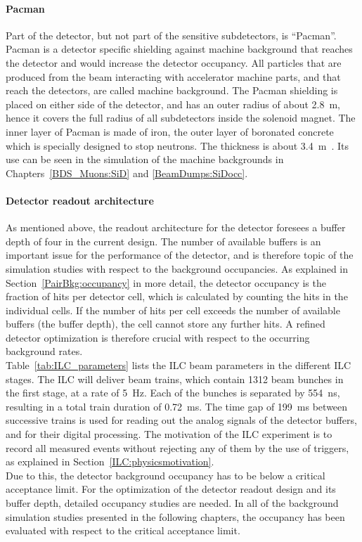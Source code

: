 \paragraph{Pacman}
Part of the detector, but not part of the sensitive subdetectors, is ``Pacman''.
Pacman is a detector specific shielding against machine background that reaches the detector and would increase the detector occupancy.
All particles that are produced from the beam interacting with accelerator machine parts, and that reach the detectors, are called machine background.
The Pacman shielding is placed on either side of the detector, and has an outer radius of about \SI{2.8}{\meter}, hence it covers the full radius of all subdetectors inside the solenoid magnet.
The inner layer of Pacman is made of iron, the outer layer of boronated concrete which is specially designed to stop neutrons.
The thickness is about \SI{3.4}{\meter}~\cite{SiD_Geo}.
Its use can be seen in the simulation of the machine backgrounds in Chapters~\ref{BDS_Muons:SiD} and \ref{BeamDumps:SiDocc}.

\paragraph{Detector readout architecture}
As mentioned above, the readout architecture for the \sid detector foresees a buffer depth of four in the current design.
The number of available buffers is an important issue for the performance of the detector, and is therefore topic of the \sid simulation studies with respect to the background occupancies.
As explained in Section~\ref{PairBkg:occupancy} in more detail, the detector occupancy is the fraction of hits per detector cell, which is calculated by counting the hits in the individual cells.
If the number of hits per cell exceeds the number of available buffers (the buffer depth), the cell cannot store any further hits.
A refined detector optimization is therefore crucial with respect to the occurring background rates.
\\Table~\ref{tab:ILC_parameters} lists the ILC beam parameters in the different ILC stages.
The ILC will deliver beam trains, which contain 1312 beam bunches in the first stage, at a rate of \SI{5}{\hertz}.
Each of the bunches is separated by \SI{554}{\nano\second}, resulting in a total train duration of \SI{0.72}{\milli\second}.
The time gap of \SI{199}{\milli\second} between successive trains is used for reading out the analog signals of the detector buffers, and for their digital processing.
The motivation of the ILC experiment is to record all measured events without rejecting any of them by the use of triggers, as explained in Section~\ref{ILC:physicsmotivation}.
\\Due to this, the detector background occupancy has to be below a critical acceptance limit.
For the optimization of the detector readout design and its buffer depth, detailed occupancy studies are needed.
In all of the background simulation studies presented in the following chapters, the \sid occupancy has been evaluated with respect to the critical acceptance limit.

